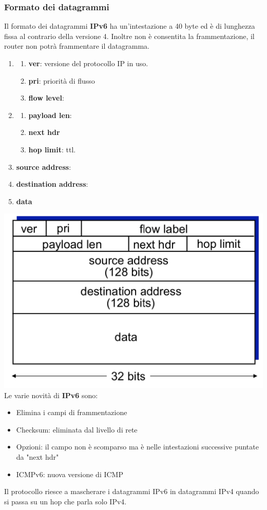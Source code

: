 \subsubsection{Formato dei datagrammi}
Il formato dei datagrammi \textbf{IPv6} ha un'intestazione a 40 byte ed è di lunghezza fissa al contrario della versione 4. Inoltre non è consentita la frammentazione, il router non potrà frammentare il datagramma. \\ 
\begin{enumerate}
  \item 
    \begin{enumerate}
      \item \textbf{ver}: versione del protocollo IP in uso. 
      \item \textbf{pri}: priorità di flusso
      \item \textbf{flow level}: 
    \end{enumerate} 
  \item 
    \begin{enumerate}
      \item \textbf{payload len}:
      \item \textbf{next hdr}
      \item \textbf{hop limit}: ttl. 
    \end{enumerate}
  \item \textbf{source address}:
  \item \textbf{destination address}: 
  \item \textbf{data}
\end{enumerate}
\includegraphics[width=\textwidth]{./img/datagramma_ipv6.png} \\ 

Le varie novità di \textbf{IPv6} sono:
\begin{itemize}
  \item Elimina i campi di frammentazione
  \item Checksum: eliminata dal livello di rete
  \item Opzioni: il campo non è scomparso ma è nelle intestazioni successive puntate da "next hdr"
  \item ICMPv6: nuova versione di ICMP
\end{itemize}
Il protocollo riesce a mascherare i datagrammi IPv6 in datagrammi IPv4 quando si passa su un hop che parla solo IPv4.

